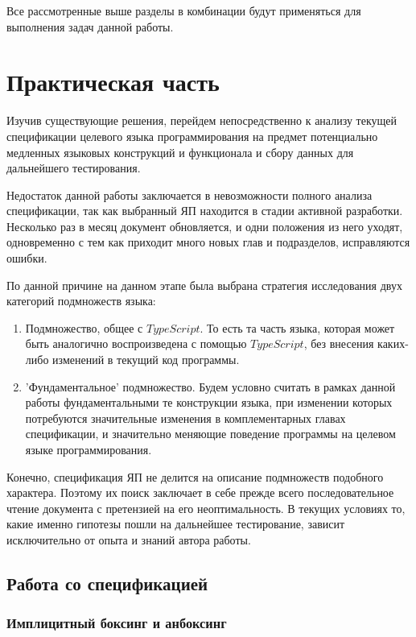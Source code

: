 \documentclass{mipt-thesis-bs}
\begin{document}
Все рассмотренные выше разделы в комбинации будут применяться для выполнения задач 
данной работы.

\chapter{Практическая часть}

Изучив существующие решения, перейдем непосредственно к анализу текущей спецификации
целевого языка программирования на предмет потенциально медленных языковых конструкций и функционала и
сбору данных для дальнейшего тестирования.

Недостаток данной работы заключается в невозможности полного анализа спецификации, так как 
выбранный ЯП находится в стадии активной разработки. Несколько раз в месяц документ обновляется, и одни 
положения из него уходят, одновременно с тем как приходит много новых глав и подразделов, исправляются 
ошибки.

По данной причине на данном этапе была выбрана стратегия исследования двух категорий 
подмножеств языка:

\begin{enumerate}
    \item Подмножество, общее с $TypeScript$. То есть та часть языка, которая может быть аналогично 
    воспроизведена с помощью $TypeScript$, без внесения каких-либо изменений в текущий код программы.
    \item 'Фундаментальное' подмножество. Будем условно считать в рамках данной работы фундаментальными
    те конструкции языка, при изменении которых потребуются значительные изменения в
    комплементарных главах спецификации, и значительно меняющие поведение 
    программы на целевом языке программирования.
\end{enumerate}

Конечно, спецификация ЯП не делится на описание подмножеств подобного характера. Поэтому их поиск 
заключает в себе прежде всего последовательное чтение документа с претензией на его неоптимальность.
В текущих условиях то, какие именно гипотезы пошли на дальнейшее тестирование, зависит
исключительно от опыта и знаний автора работы.

\section{Работа со спецификацией}

\subsection{Имплицитный боксинг и анбоксинг}
\end{document}

